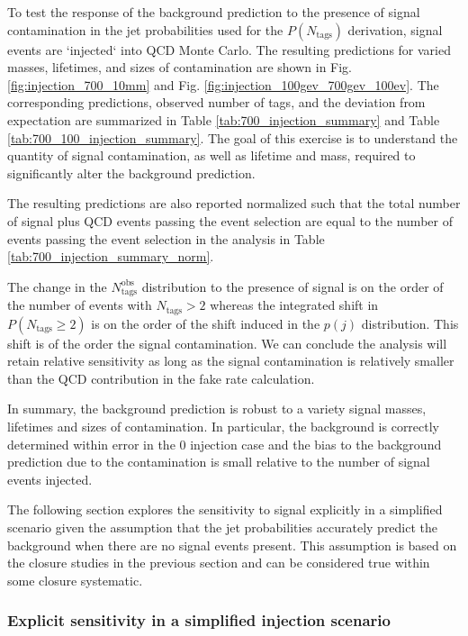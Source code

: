 To test the response of the background prediction to the presence of signal contamination in the jet probabilities used for the $P(N_{\textrm{tags}})$ derivation,
signal events are `injected` into QCD Monte Carlo. The resulting predictions for varied masses,
lifetimes, and sizes of contamination are shown in Fig. \ref{fig:injection_700_10mm} and Fig. \ref{fig:injection_100gev_700gev_100ev}. The corresponding predictions, observed number of tags, and the
deviation from expectation are summarized in Table \ref{tab:700_injection_summary}
and Table \ref{tab:700_100_injection_summary}. The goal of this exercise
is to understand the quantity of signal contamination, as well as lifetime and mass, required to significantly alter the background prediction. 

The resulting predictions are also reported normalized such that the total number of signal plus QCD events passing the event selection are equal to the number of events passing the
event selection in the analysis in Table \ref{tab:700_injection_summary_norm}.

The change in the $N_{\textrm{tags}}^{\textrm{obs}}$ distribution to the presence of signal is on the order of the number of events with $N_{\textrm{tags}}>2$ whereas 
the integrated shift in $P(N_{\textrm{tags}}\geq2)$ is on the order of the shift induced in the $p(j)$ distribution. This shift is of the order the signal contamination. 
We can conclude the analysis will retain relative sensitivity as long as the signal contamination is relatively smaller than the QCD contribution in 
the fake rate calculation. 

In summary, the background prediction is robust to a variety signal masses, lifetimes and sizes of contamination. In particular, the
background is correctly determined within error in the 0 injection case and the bias to the background prediction due to the 
contamination is small relative to the number of signal events injected.

The following section explores the  sensitivity to signal explicitly in a simplified scenario given the assumption that the jet probabilities accurately predict the
background when there are no signal events present. This assumption is based on the closure studies in the previous section and can be considered
true within some closure systematic.

\subsubsection{Explicit sensitivity in a simplified injection scenario}

